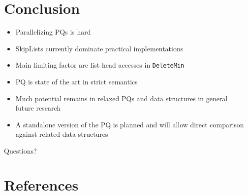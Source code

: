\documentclass[usenames,dvipsnames]{beamer}
\begin{document}
\section{Conclusion} \label{sec:conclusion}

\begin{frame}{}
\begin{itemize}
\item Parallelizing \acp{PQ} is hard
\item SkipLists currently dominate practical implementations
\item Main limiting factor are list head accesses in \lstinline|DeleteMin|
\item \citeauthor{linden2013skiplist} \ac{PQ} is state of the art in strict
      semantics
\item Much potential remains in relaxed \acp{PQ} and data structures in general
      \textrightarrow ~ future research
\item A standalone version of the \citeauthor{wimmer2013data} \ac{PQ} is planned
      and will allow direct comparison against related data structures
\end{itemize}
\end{frame}

\begin{frame}{}
\centering
Questions?
\end{frame}

\section{References} \label{sec:references}

\begin{frame}[allowframebreaks]{}
\printbibliography
\end{frame}
\end{document}
